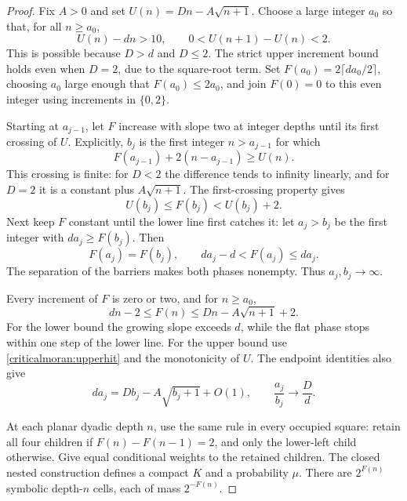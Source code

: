 \begin{proof}
Fix \(A>0\) and set \(U(n)=Dn-A\sqrt{n+1}\). Choose a large
integer \(a_0\) so that, for all \(n\ge a_0\),
\[
 U(n)-dn>10,\qquad 0<U(n+1)-U(n)<2.
\]
This is possible because \(D>d\) and \(D\le2\). The strict upper
increment bound holds even when \(D=2\), due to the square-root term.
Set \(F(a_0)=2\lceil da_0/2\rceil\), choosing \(a_0\) large enough
that \(F(a_0)\le2a_0\), and join \(F(0)=0\) to this even integer
using increments in \(\{0,2\}\).

Starting at \(a_{j-1}\), let \(F\) increase with slope two at integer
depths until its first crossing of \(U\). Explicitly, \(b_j\) is
the first integer \(n>a_{j-1}\) for which
\[
 F(a_{j-1})+2(n-a_{j-1})\ge U(n).
\]
This crossing is finite: for \(D<2\) the difference tends to
infinity linearly, and for \(D=2\) it is a constant plus
\(A\sqrt{n+1}\). The first-crossing property gives
\begin{equation}\label{criticalmoran:upperhit}
 U(b_j)\le F(b_j)<U(b_j)+2.
\end{equation}
Next keep \(F\) constant until the lower line first catches it:
let \(a_j>b_j\) be the first integer with \(da_j\ge F(b_j)\).
Then
\begin{equation}\label{criticalmoran:lowerhit}
 F(a_j)=F(b_j),\qquad da_j-d<F(a_j)\le da_j.
\end{equation}
The separation of the barriers makes both phases nonempty. Thus
\(a_j,b_j\to\infty\).

Every increment of \(F\) is zero or two, and for \(n\ge a_0\),
\begin{equation}\label{criticalmoran:barriers}
 dn-2\le F(n)\le Dn-A\sqrt{n+1}+2.
\end{equation}
For the lower bound the growing slope exceeds \(d\), while the
flat phase stops within one step of the lower line. For the upper
bound use \eqref{criticalmoran:upperhit} and the monotonicity of \(U\).
The endpoint identities also give
\begin{equation}\label{criticalmoran:ratio}
 da_j=Db_j-A\sqrt{b_j+1}+O(1),\qquad
 \frac{a_j}{b_j}\longrightarrow\frac Dd.
\end{equation}

At each planar dyadic depth \(n\), use the same rule in every
occupied square: retain all four children if
\(F(n)-F(n-1)=2\), and only the lower-left child otherwise.
Give equal conditional weights to the retained children.
The closed nested construction defines a compact \(K\) and a
probability \(\mu\). There are \(2^{F(n)}\) symbolic depth-\(n\)
cells, each of mass \(2^{-F(n)}\).


\end{proof}
